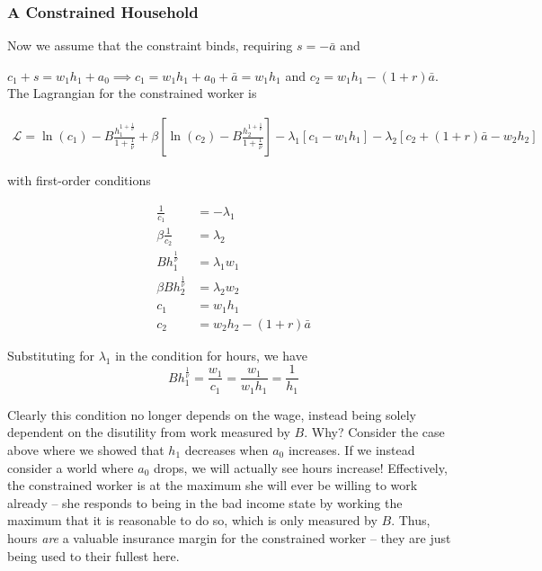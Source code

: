 \documentclass[12pt, letterpaper, parskip = full]{article}
\begin{document}
    \subsubsection{A Constrained Household}

    Now we assume that the constraint binds, requiring \(s = -\bar{a}\) and 
    
    \(c_1 + s = w_1 h_1 + a_0 \implies c_1 = w_1 h_1 + a_0 + \bar{a} = w_1 h_1\) and \(c_2 = w_1 h_1 - (1+r) \bar{a} \). The Lagrangian for the constrained worker is

    \begin{align*}
    \mathcal{L} = \ln(c_1) - B \frac{h_1^{1 + \frac{1}{\nu}}}{1 + \frac{1}{\nu}} + \beta \left[ \ln(c_2) - B \frac{h_2^{1 + \frac{1}{\nu}}}{1 + \frac{1}{\nu}} \right] - \lambda_1 \left[ c_1 - w_1 h_1 \right] - \lambda_2 \left[ c_2 + (1+r) \bar{a} - w_2 h_2 \right]
    \end{align*}

    with first-order conditions

    \begin{align*}
        \frac{1}{c_1} &= - \lambda_1 \\
        \beta \frac{1}{c_2} &= \lambda_2 \\
        B h_1^{\frac{1}{\nu}} &= \lambda_1 w_1 \\
        \beta B h_2^{\frac{1}{\nu}} &= \lambda_2 w_2 \\
        c_1 &= w_1 h_1 \\
        c_2  &= w_2 h_2 - (1+r) \bar{a}
    \end{align*}

    Substituting for \(\lambda_1\) in the condition for hours, we have
    \[ B h_1^{\frac{1}{\nu}} = \frac{w_1}{c_1} = \frac{w_1}{w_1 h_1} = \frac{1}{h_1}     \]

    Clearly this condition no longer depends on the wage, instead being solely dependent on the disutility from work measured by \(B\). Why? Consider the case above where we showed that \(h_1\) decreases when \(a_0\) increases. If we instead consider a world where \(a_0\) drops, we will actually see hours increase! Effectively, the constrained worker is at the maximum she will ever be willing to work already -- she responds to being in the bad income state by working the maximum that it is reasonable to do so, which is only measured by \(B\). Thus, hours \emph{are} a valuable insurance margin for the constrained worker -- they are just being used to their fullest here.
\end{document}

